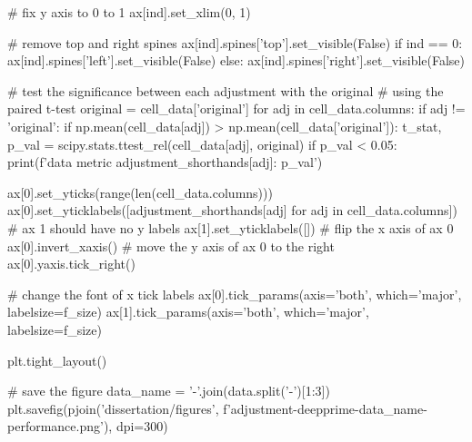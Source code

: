        # fix y axis to 0 to 1
        ax[ind].set_xlim(0, 1)
        
        # remove top and right spines
        ax[ind].spines['top'].set_visible(False)
        if ind == 0:
            ax[ind].spines['left'].set_visible(False)
        else:
            ax[ind].spines['right'].set_visible(False)
            
        # test the significance between each adjustment with the original
        # using the paired t-test
        original = cell_data['original']
        for adj in cell_data.columns:
            if adj != 'original':
                if np.mean(cell_data[adj]) > np.mean(cell_data['original']):
                    t_stat, p_val = scipy.stats.ttest_rel(cell_data[adj], original)
                    if p_val < 0.05:
                        print(f'{data} {metric} {adjustment_shorthands[adj]}: {p_val}')
    
    ax[0].set_yticks(range(len(cell_data.columns)))
    ax[0].set_yticklabels([adjustment_shorthands[adj] for adj in cell_data.columns])
    # ax 1 should have no y labels
    ax[1].set_yticklabels([])
    # flip the x axis of ax 0
    ax[0].invert_xaxis()
    # move the y axis of ax 0 to the right
    ax[0].yaxis.tick_right()
    
    # change the font of x tick labels
    ax[0].tick_params(axis='both', which='major', labelsize=f_size)
    ax[1].tick_params(axis='both', which='major', labelsize=f_size)
        
    plt.tight_layout()
    
    # save the figure
    data_name = '-'.join(data.split('-')[1:3])
    plt.savefig(pjoin('dissertation/figures', f'adjustment-deepprime-{data_name}-performance.png'), dpi=300)